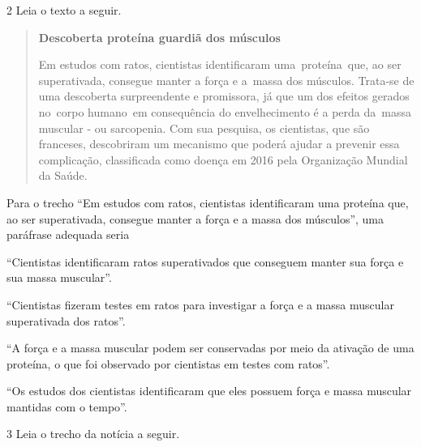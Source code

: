 \num{2} Leia o texto a seguir.

\begin{quote}
\textbf{Descoberta proteína guardiã dos músculos}


Em estudos com ratos, cientistas identificaram uma~proteína~que, ao ser
superativada, consegue manter a força e a~massa dos músculos. Trata-se
de uma descoberta surpreendente e promissora, já que um dos efeitos
gerados no~corpo humano~em consequência do envelhecimento é a perda
da~massa muscular - ou sarcopenia. Com sua pesquisa, os cientistas, que
são franceses, descobriram um mecanismo que poderá ajudar a prevenir
essa complicação, classificada como doença em 2016 pela Organização
Mundial da Saúde.

\end{quote}

Para o trecho ``Em estudos com ratos, cientistas identificaram uma
proteína que, ao ser superativada, consegue manter a força e a massa dos
músculos'', uma paráfrase adequada seria

\begin{escolha}
\item ``Cientistas identificaram ratos superativados que conseguem manter
sua força e sua massa muscular''.

\item ``Cientistas fizeram testes em ratos para investigar a força e a
massa muscular superativada dos ratos''.

\item ``A força e a massa muscular podem ser conservadas por meio da
ativação de uma proteína, o que foi observado por cientistas em testes
com ratos''.

\item ``Os estudos dos cientistas identificaram que eles possuem força e
massa muscular mantidas com o tempo''.
\end{escolha}

\num{3} Leia o trecho da notícia a seguir.

